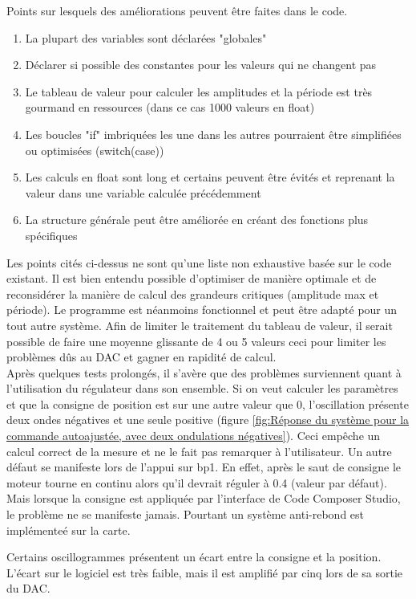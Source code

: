 Points sur lesquels des améliorations peuvent être faites dans le code.
\begin{enumerate}
	\item La plupart des variables sont déclarées "globales"
	\item Déclarer si possible des constantes pour les valeurs qui ne changent pas
	\item Le tableau de valeur pour calculer les amplitudes et la période est très gourmand en ressources (dans ce cas 1000 valeurs en float)
	\item Les boucles "if" imbriquées les une dans les autres pourraient être simplifiées ou optimisées (switch(case))
	\item Les calculs en float sont long et certains peuvent être évités et reprenant la valeur dans une variable calculée précédemment
	\item La structure générale peut être améliorée en créant des fonctions plus spécifiques
\end{enumerate} 

Les points cités ci-dessus ne sont qu'une liste non exhaustive basée sur le code existant. Il est bien entendu possible d'optimiser de manière optimale et de reconsidérer la manière de calcul des grandeurs critiques (amplitude max et période). Le programme est néanmoins fonctionnel et peut être adapté pour un tout autre système. Afin de limiter le traitement du tableau de valeur, il serait possible de faire une moyenne glissante de 4 ou 5 valeurs ceci pour limiter les problèmes dûs au DAC et gagner en rapidité de calcul.\\
Après quelques tests prolongés, il s'avère que des problèmes surviennent quant à l'utilisation du régulateur dans son ensemble. Si on veut calculer les paramètres et que la consigne de position est sur une autre valeur que 0, l'oscillation présente deux ondes négatives et une seule positive (figure \ref{fig:Réponse du système pour la commande autoajustée, avec deux ondulations négatives}). Ceci empêche un calcul correct de la mesure et ne le fait pas remarquer à l'utilisateur. Un autre défaut se manifeste lors de l'appui sur bp1. En effet, après le saut de consigne le moteur tourne en continu alors qu'il devrait réguler à 0.4 (valeur par défaut). Mais lorsque la consigne est appliquée par l'interface de Code Composer Studio, le problème ne se manifeste jamais. Pourtant un système anti-rebond est implémenteé sur la carte.

 Certains oscillogrammes présentent un écart entre la consigne et la position. L'écart sur le logiciel est très faible, mais il est amplifié par cinq lors de sa sortie du DAC.